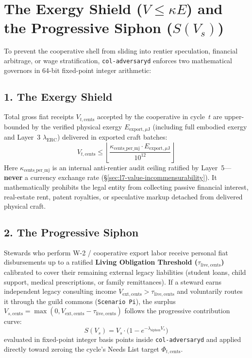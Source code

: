 \section{The Exergy Shield ($V \le \kappa E$) and the Progressive Siphon ($S(V_s)$)}
\label{sec:l7-exergy-shield-siphon}

To prevent the cooperative shell from sliding into rentier speculation, financial arbitrage, or wage stratification, \texttt{col-adversaryd} enforces two mathematical governors in 64-bit fixed-point integer arithmetic:

\subsection{1. The Exergy Shield}
Total gross fiat receipts $V_{t,\mathrm{cents}}$ accepted by the cooperative in cycle~$t$ are upper-bounded by the verified physical exergy $E_{\mathrm{export},\mu\mathrm{J}}$ (including full embodied exergy and Layer~3 $\lambda_{\mathrm{ERC}}$) delivered in exported craft batches:
\begin{equation}
V_{t,\mathrm{cents}} \le \left\lfloor \frac{\kappa_{\mathrm{cents\_per\_mj}} \cdot E_{\mathrm{export},\mu\mathrm{J}}}{10^{12}} \right\rfloor
\label{eq:ch8-exergy-shield}
\end{equation}
Here $\kappa_{\mathrm{cents\_per\_mj}}$ is an internal anti-rentier audit ceiling ratified by Layer~5---\textbf{never} a currency exchange rate (\S\ref{sec:l7-value-incommensurability}). It mathematically prohibits the legal entity from collecting passive financial interest, real-estate rent, patent royalties, or speculative markup detached from delivered physical craft.

\subsection{2. The Progressive Siphon}
Stewards who perform W-2 / cooperative export labor receive personal fiat disbursements up to a ratified \textbf{Living Obligation Threshold ($\tau_{\mathrm{live,cents}}$)} calibrated to cover their remaining external legacy liabilities (student loans, child support, medical prescriptions, or family remittances). If a steward earns independent legacy consulting income $V_{\mathrm{ext,cents}} > \tau_{\mathrm{live,cents}}$ and voluntarily routes it through the guild commons (\texttt{Scenario Pi}), the surplus $V_{s,\mathrm{cents}} = \max(0, V_{\mathrm{ext,cents}} - \tau_{\mathrm{live,cents}})$ follows the progressive contribution curve:
\begin{equation}
S(V_s) = V_s \cdot \bigl(1 - e^{-\lambda_{\mathrm{siphon}} V_s}\bigr)
\label{eq:ch8-progressive-siphon}
\end{equation}
evaluated in fixed-point integer basis points inside \texttt{col-adversaryd} and applied directly toward zeroing the cycle's Needs List target $\Phi_{t,\mathrm{cents}}$.

